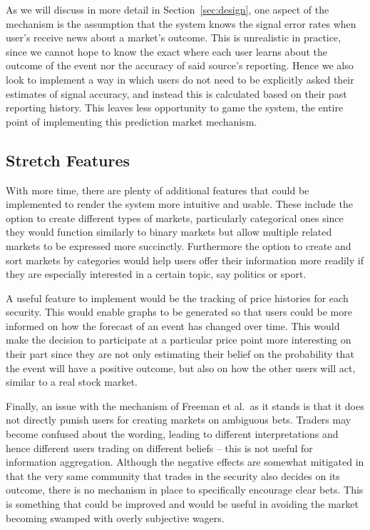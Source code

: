 As we will discuss in more detail in Section~\ref{sec:design}, one aspect of
the mechanism is the assumption that the system knows the signal error rates
when user's receive news about a market's outcome. This is unrealistic in
practice, since we cannot hope to know the exact where each user learns about
the outcome of the event nor the accuracy of said source's reporting. Hence we
also look to implement a way in which users do not need to be explicitly asked
their estimates of signal accuracy, and instead this is calculated based on
their past reporting history. This leaves less opportunity to game the system,
the entire point of implementing this prediction market mechanism.

\subsection{Stretch Features}

With more time, there are plenty of additional features that could be
implemented to render the system more intuitive and usable. These include the
option to create different types of markets, particularly categorical ones
since they would function similarly to binary markets but allow multiple
related markets to be expressed more succinctly. Furthermore the option to
create and sort markets by categories would help users offer their information
more readily if they are especially interested in a certain topic, say politics
or sport.

A useful feature to implement would be the tracking of price histories for each
security. This would enable graphs to be generated so that users could be more
informed on how the forecast of an event has changed over time. This would make
the decision to participate at a particular price point more interesting on
their part since they are not only estimating their belief on the probability
that the event will have a positive outcome, but also on how the other users
will act, similar to a real stock market.

Finally, an issue with the mechanism of Freeman et al.\ as it stands is that it
does not directly punish users for creating markets on ambiguous bets. Traders
may become confused about the wording, leading to different interpretations and
hence different users trading on different beliefs -- this is not useful for
information aggregation. Although the negative effects are somewhat mitigated
in that the very same community that trades in the security also decides on its
outcome, there is no mechanism in place to specifically encourage clear bets.
This is something that could be improved and would be useful in avoiding the
market becoming swamped with overly subjective wagers.

